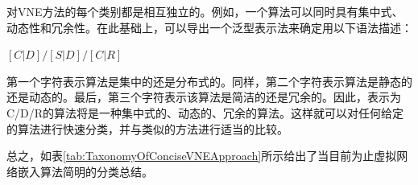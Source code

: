 对VNE方法的每个类别都是相互独立的。例如，一个算法可以同时具有集中式、动态性和冗余性。在此基础上，可以导出一个泛型表示法来确定用以下语法描述：

\begin{center}
  $[C|D]/[S|D]/[C|R]$
\end{center}
第一个字符表示算法是集中的还是分布式的。同样，第二个字符表示算法是静态的还是动态的。最后，第三个字符表示该算法是简洁的还是冗余的。因此，表示为C/D/R的算法将是一种集中式的、动态的、冗余的算法。这样就可以对任何给定的算法进行快速分类，并与类似的方法进行适当的比较。


总之，如表\ref{tab:TaxonomyOfConciseVNEApproach}所示给出了当目前为止虚拟网络嵌入算法简明的分类总结。
\renewcommand\arraystretch{1.0}
\wuhao
